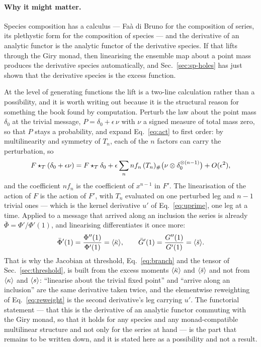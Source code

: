 \paragraph{Why it might matter.} Species composition has a calculus ---
Fa\`a di Bruno for the composition of series, its plethystic form for the
composition of species --- and the derivative of an analytic functor is the
analytic functor of the derivative species. If that lifts through the Giry
monad, then linearising the ensemble map about a point mass produces the
derivative species automatically, and Sec.~\ref{sec:sp-holes} has just
shown that the derivative species is the excess function.

At the level of generating functions the lift is a two-line calculation
rather than a possibility, and it is worth writing out because it is the
structural reason for something the book found by computation. Perturb the
law about the point mass $\delta_{0}$ at the trivial message,
$P=\delta_{0}+\epsilon\,\nu$ with $\nu$ a signed measure of total mass
zero, so that $P$ stays a probability, and expand Eq.~\eqref{eq:act} to first order:
by multilinearity and symmetry of $T_{n}$, each of the $n$ factors can carry
the perturbation, so
\[
  F\star_{T}(\delta_{0}+\epsilon\nu)
  =F\star_{T}\delta_{0}
   +\epsilon\sum_{n}n f_{n}\,(T_{n})_{\#}
     \bigl(\nu\otimes\delta_{0}^{\otimes(n-1)}\bigr)+O(\epsilon^{2}),
\]
and the coefficient $n f_{n}$ is the coefficient of $x^{n-1}$ in $F'$. The
linearisation of the action of $F$ is the action of $F'$, with $T_{n}$
evaluated on one perturbed leg and $n-1$ trivial ones --- which is the
kernel derivative $u'$ of Eq.~\eqref{eq:uprime}, one leg at a time. Applied
to a message that arrived along an inclusion the series is already
$\bar\Phi=\Phi'/\Phi'(1)$, and linearising differentiates it once more:
\[
  \bar\Phi'(1)=\frac{\Phi''(1)}{\Phi'(1)}=\langle \bar\kappa \rangle,
  \qquad
  \bar G'(1)=\frac{G''(1)}{G'(1)}=\langle \bar s \rangle.
\]
That is why the Jacobian at threshold, Eq.~\eqref{eq:branch} and the tensor
of Sec.~\ref{sec:threshold}, is built from the excess moments $\langle \bar\kappa \rangle$
and $\langle \bar s \rangle$ and not from $\langle \kappa \rangle$ and $\langle s \rangle$: ``linearise
about the trivial fixed point'' and ``arrive along an inclusion'' are the
same derivative taken twice, and the elementwise reweighting of
Eq.~\eqref{eq:reweight} is the second derivative's leg carrying $u'$. The
functorial statement --- that this is the derivative of an analytic functor
commuting with the Giry monad, so that it holds for any species and any
monad-compatible multilinear structure and not only for the series at hand
--- is the part that remains to be written down, and it is stated here as
a possibility and not a result.

